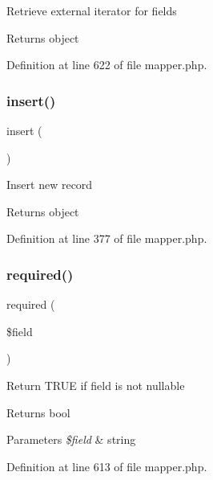 Retrieve external iterator for fields \begin{DoxyReturn}{Returns}
object 
\end{DoxyReturn}


Definition at line 622 of file mapper.\+php.

\hypertarget{class_d_b_1_1_s_q_l_1_1_mapper_a473241246338cfccc4709ba896749019}{}\label{class_d_b_1_1_s_q_l_1_1_mapper_a473241246338cfccc4709ba896749019} 
\subsubsection{\texorpdfstring{insert()}{insert()}}
{\footnotesize\ttfamily insert (\begin{DoxyParamCaption}{ }\end{DoxyParamCaption})}

Insert new record \begin{DoxyReturn}{Returns}
object 
\end{DoxyReturn}


Definition at line 377 of file mapper.\+php.

\hypertarget{class_d_b_1_1_s_q_l_1_1_mapper_ab7379056ffedc01b4f9688847bf83ad8}{}\label{class_d_b_1_1_s_q_l_1_1_mapper_ab7379056ffedc01b4f9688847bf83ad8} 
\subsubsection{\texorpdfstring{required()}{required()}}
{\footnotesize\ttfamily required (\begin{DoxyParamCaption}\item[{}]{\$field }\end{DoxyParamCaption})}

Return T\+R\+UE if field is not nullable \begin{DoxyReturn}{Returns}
bool 
\end{DoxyReturn}

\begin{DoxyParams}{Parameters}
{\em \$field} & string \\
\hline
\end{DoxyParams}


Definition at line 613 of file mapper.\+php.

